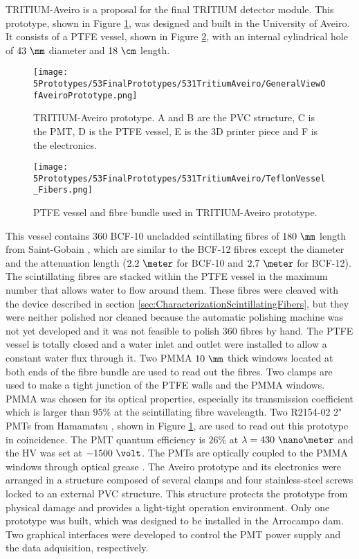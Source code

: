 TRITIUM-Aveiro is a proposal for the final TRITIUM detector module. This prototype, shown in Figure \ref{fig:TritiumAveiro0}, was designed and built in the University of Aveiro. It consists of a PTFE vessel, shown in Figure \ref{fig:TeflonStructureFibersTritiumAveiro0}, with an internal cylindrical hole of $43~\mm$ diameter and $18~\cm$ length.
\begin{figure}[h]
\centering
\texttt{[image: 5Prototypes/53FinalPrototypes/531TritiumAveiro/GeneralViewOfAveiroPrototype.png]}
\caption{TRITIUM-Aveiro prototype. A and B are the PVC structure, C is the PMT, D is the PTFE vessel, E is the 3D printer piece and F is the electronics.\label{fig:TritiumAveiro0}}
\end{figure}
\begin{figure}[h]
\centering
\texttt{[image: 5Prototypes/53FinalPrototypes/531TritiumAveiro/TeflonVessel\_Fibers.png]}
\caption{PTFE vessel and fibre bundle used in TRITIUM-Aveiro prototype.  \label{fig:TeflonStructureFibersTritiumAveiro0}}
\end{figure}
This vessel contains $360$ BCF-10 uncladded scintillating fibres of $180~\mm$ length from Saint-Gobain \cite{DataSheetBCF12Fiber}, which are similar to the BCF-12 fibres except the diameter and the attenuation length ($2.2~\meter$ for BCF-10 and $2.7~\meter$ for BCF-12). The scintillating fibres are stacked within the PTFE vessel in the maximum number that allows water to flow around them. These fibres were cleaved with the device described in section \ref{sec:CharacterizationScintillatingFibers}, but they were neither polished nor cleaned because the automatic polishing machine was not yet developed and it was not feasible to polish 360 fibres by hand. The PTFE vessel is totally closed and a water inlet and outlet were installed to allow a constant water flux through it. Two PMMA $10~\mm$ thick windows located at both ends of the fibre bundle are used to read out the fibres. Two clamps are used to make a tight junction of the PTFE walls and the PMMA windows. PMMA was chosen for its optical properties, especially its transmission coefficient which is larger than $95\%$ at the scintillating fibre wavelength. Two R2154-02 2" PMTs from Hamamatsu \cite{DataSheetPMTsAveiro}, shown in Figure \ref{fig:TritiumAveiro0}, are used to read out this prototype in coincidence. The PMT quantum efficiency is $26\%$ at $\lambda=430~\nano\meter$ and the HV was set at $-1500~\volt$. The PMTs are optically coupled to the PMMA windows through optical grease \cite{OpticalGrease}. The Aveiro prototype and its electronics were arranged in a structure composed of several clamps and four stainless-steel screws locked to an external PVC structure. This structure protects the prototype from physical damage and provides a light-tight operation environment. Only one prototype was built, which was designed to be installed in the Arrocampo dam. Two graphical interfaces were developed to control the PMT power supply and the data adquisition, respectively. 

